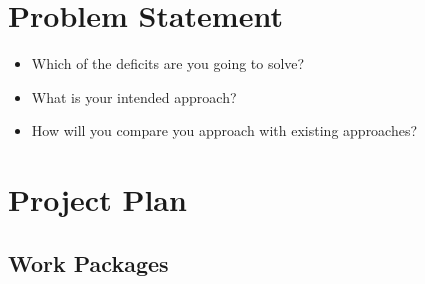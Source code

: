 \documentclass[thesis]{mas_proposal}
\begin{document}
\section{Problem Statement}
\begin{itemize}


      \item Which of the deficits are you going to solve?
      \item What is your intended approach?
      \item How will you compare you approach with existing approaches?



\end{itemize}

\section{Project Plan}

\subsection{Work Packages}
\end{document}
